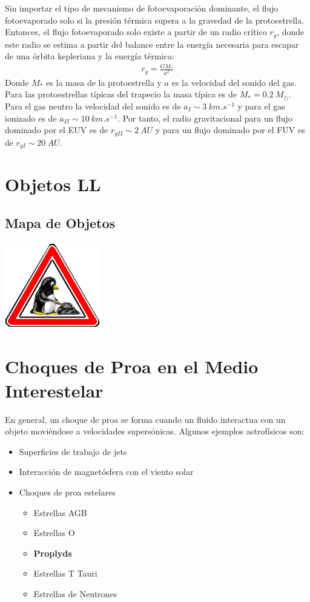 Sin importar el tipo de mecanismo de fotoevaporación dominante, el flujo fotoevaporado solo si la presión térmica supera a la gravedad de la protoestrella. Entonces, el flujo fotoevaporado solo existe a partir de un radio crítico $r_g$, donde este radio se estima a partir del balance entre la energía necesaria para escapar de una órbita kepleriana y la energía térmica:
\begin{align}
  r_g = \frac{GM_*}{a^2}
\end{align}
Donde $M_*$ es la masa de la protoestrella y $a$ es la velocidad del sonido del gas. Para las protoestrellas típicas del trapecio la masa típica es de
$M_* = 0.2~M_\odot$. Para el gas neutro la velocidad del sonido es de $a_I \sim \SI{3}{km.s^{-1}}$ y para el gas ionizado es de $a_{II} \sim \SI{10}{km.s^{-1}}$.
Por tanto, el radio gravitacional para un flujo dominado por el EUV es de $r_{gII} \sim \SI{2}{AU}$ y para un flujo dominado por el FUV es de $r_{gI} \sim \SI{20}{AU}$.
\section{Objetos LL}
\subsection{Mapa de Objetos}
\includegraphics[width=0.1\linewidth]{./Figures/tux-development}

\section{Choques de Proa en el Medio Interestelar}

En general, un choque de proa se forma cuando un fluido interactua con un objeto moviéndose a velocidades supersónicas. Algunos ejemplos astrofísicos son:

\begin{itemize}
\item Superficies de trabajo de jets
\item Interacción de magnetósfera con el viento solar
\item Choques de proa estelares
  \begin{itemize}
  \item Estrellas AGB
  \item Estrellas O
  \item \textbf{Proplyds}
  \item Estrellas T Tauri
  \item Estrellas de Neutrones
  \end{itemize}
\end{itemize}

